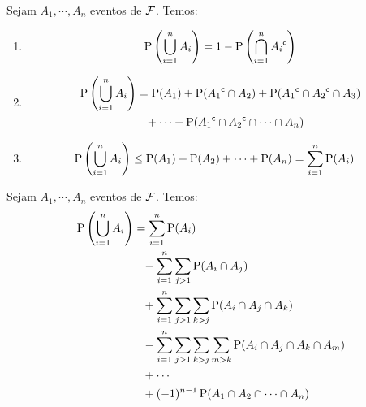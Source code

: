 \begin{lemma}\label{lem:ch01-uniao-gen}
    Sejam $A_1, \cdots, A_n$ eventos de $\operatorname{\mathcal{F}}$. Temos:
    \begin{enumerate}
        \item \begin{align}
            \operatorname{P}\left(\bigcup_{i=1}^n A_i\right)
                = 1 - \operatorname{P}\left(\bigcap_{i=1}^n {A_i}^{\mathsf{c}}\right)
            \label{eq:ch01-uniao-gen-1}
        \end{align}
        \item \begin{align}
            \operatorname{P}\left(\bigcup_{i=1}^n A_i\right)
                &= \operatorname{P}(A_1) 
                + \operatorname{P}({A_1}^{\mathsf{c}} \cap A_2)
                + \operatorname{P}({A_1}^{\mathsf{c}} \cap {A_2}^{\mathsf{c}} \cap A_3) \\
                &\phantom{=}
                + \cdots
                + \operatorname{P}({A_1}^{\mathsf{c}} \cap {A_2}^{\mathsf{c}} \cap \cdots \cap A_n)
            \label{eq:ch01-uniao-gen-2}
        \end{align}
        \item \begin{align}
            \operatorname{P}\left(\bigcup_{i=1}^n A_i\right)
                &\leq \operatorname{P}(A_1) + \operatorname{P}(A_2) + \cdots + \operatorname{P}(A_n)
                = \sum_{i=1}^n \operatorname{P}(A_i)
                \label{eq:ch01-uniao-gen-3}
        \end{align}
    \end{enumerate}
\end{lemma}

\begin{lemma}\label{lem:ch01-add-sub}
    Sejam $A_1, \cdots, A_n$ eventos de $\operatorname{\mathcal{F}}$. Temos:
    \begin{align}
        \operatorname{P}\left(\bigcup_{i=1}^n A_i\right)
            &= \sum_{i=1}^n \operatorname{P}(A_i) \notag \\
            &\phantom{=}
            - \sum_{i=1}^n \sum_{j > 1} \operatorname{P}(A_i \cap A_j) \notag \\
            &\phantom{=}
            + \sum_{i=1}^n \sum_{j > 1} \sum_{k > j}
                \operatorname{P}(A_i \cap A_j \cap A_k)  \label{eq:ch01-add-sub} \\
            &\phantom{=}
            - \sum_{i=1}^n \sum_{j > 1} \sum_{k > j} \sum_{m > k}
                \operatorname{P}(A_i \cap A_j \cap A_k \cap A_m) \notag \\
            &\phantom{=} + \cdots \notag \\
            &\phantom{=}
            + (-1)^{n - 1} \operatorname{P}(A_1 \cap A_2 \cap \cdots \cap A_n) \notag
    \end{align}
\end{lemma}

